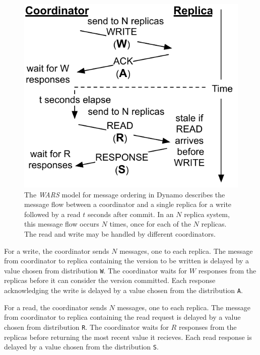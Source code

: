 \documentclass{vldb}
\begin{document}
\begin{figure}
\centering
\includegraphics[width=.8\columnwidth]{figs/dynamostale.pdf}
\vspace{-8pt}
\caption{The \textit{WARS} model for message ordering in Dynamo
  describes the message flow between a coordinator and a single
  replica for a write followed by a read $t$ seconds after commit.  In
  an $N$ replica system, this message flow occurs $N$ times, once for
  each of the $N$ replicas.  The read and write may be handled by
  different coordinators.}
\vspace{-12pt}
\label{fig:dynamo-diagram}
\end{figure}

For a write, the coordinator sends $N$ messages, one to each
replica. The message from coordinator to replica containing the
version to be written is delayed by a value chosen from distribution
\texttt{W}.  The coordinator waits for $W$ responses from the replicas
before it can consider the version committed.  Each response
acknowledging the write is delayed by a value chosen from the
distribution \texttt{A}.

For a read, the coordinator sends $N$ messages, one to each replica.
The message from coordinator to replica containing the read request is
delayed by a value chosen from distribution \texttt{R}.  The
coordinator waits for $R$ responses from the replicas before returning
the most recent value it recieves.  Each read response is delayed by a
value chosen from the distribution \texttt{S}.
\end{document}
